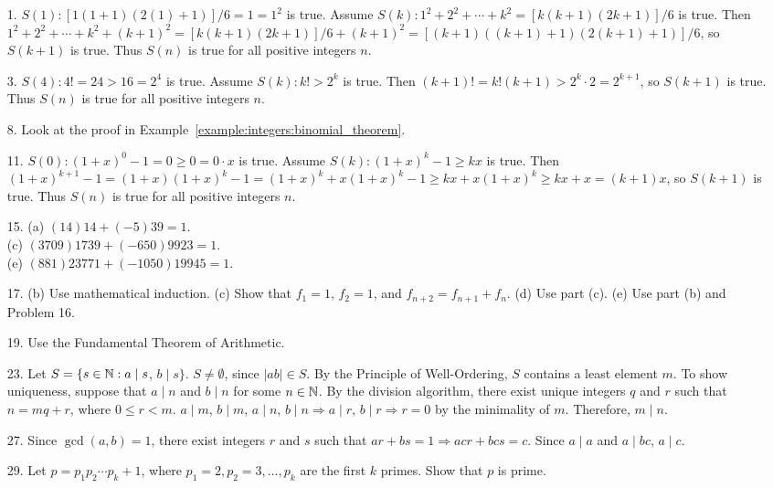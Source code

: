  
{\small
\begin{itemize}
 
 
\item[1.]
$S(1): [1(1+1)(2(1) + 1)]/6 = 1 = 1^2$ is true. Assume $S(k): 1^2 +2^2
+ \cdots + k^2 = [k(k+1)(2k+1)]/6$ is true. Then $1^2 + 2^2 + \cdots +
k^2 + (k+1)^2 = [k(k+1)(2k+1)]/6 + (k+1)^2 = [(k+1)((k+1) +1)(2(k+1) +
1)]/6$, so $S(k+1)$ is true. Thus $S(n)$ is true for all positive
integers $n$. 
 
\item[3.]
$S(4): 4! = 24 > 16 =2^4$ is true. Assume $S(k): k! >2^k$ is true.
Then $(k+1)! = k! (k+1) > 2^k \cdot 2 = 2^{k+1}$, so $S(k+1)$ is true.
Thus $S(n)$ is true for all positive integers $n$. 
 
 
\item[8.]
Look at the proof in Example~\ref{example:integers:binomial_theorem}.
 
\item[11.]
$S(0): (1+x)^0 -1 = 0 \geq 0 = 0 \cdot x$ is true. Assume $S(k):
(1+x)^k -1 \geq kx$ is true. Then $(1+x)^{k+1} - 1 = (1+x)(1+x)^k -1 =
(1+x)^k + x(1+x)^k -1 \geq kx + x(1+x)^k \geq kx + x = (k+1)x$, so
$S(k+1)$ is true. Thus $S(n)$ is true for all positive integers $n$.
 
 
\item[15.]
(a) $(14)14 + (-5)39 = 1$.\\
(c) $(3709) 1739 + (-650) 9923 = 1$.\\
(e) $(881) 23771 + (-1050) 19945 = 1$.
 
 
\item[17.]
(b) Use mathematical induction.
(c) Show that $f_1 = 1$, $f_2 = 1$, and $f_{n + 2}
= f_{n + 1} + f_n$.
(d) Use part (c).
(e) Use part (b) and Problem 16.
 
 
\item[19.]
Use the Fundamental Theorem of Arithmetic.
 
 
\item[23.]
Let $S = \{s \in {\Bbb N} : a \mid s$, $b \mid s \}$. $S \neq \emptyset$,
since $|ab| \in S$. By the Principle of Well-Ordering, $S$ contains a
least element $m$. To show uniqueness, suppose that $a \mid n$ and $b
\mid n$ for some $n \in {\Bbb N}$. By the division algorithm, there
exist unique integers $q$ and $r$ such that $n = mq + r$, where $0
\leq r < m$. $a \mid m$, $b \mid m$, $a \mid n$, $b \mid n \Rightarrow a
\mid r$, $b \mid r \Rightarrow r = 0$ by the minimality of $m$.
Therefore, $m \mid n$. 
 
 
\item[27.]
Since $\gcd(a,b)=1$, there exist integers $r$ and $s$ such that $ar +
bs =1 \Rightarrow acr+bcs =c$. Since $a \mid a$ and $a \mid bc$, $a
\mid c$.
 
 
\item[29.]
Let $p = p_1 p_2 \cdots p_k + 1$, where $p_1 = 2, p_2 = 3, \ldots,
p_k$ are the first $k$ primes.  Show that $p$ is prime.
 
\end{itemize}
}
 
